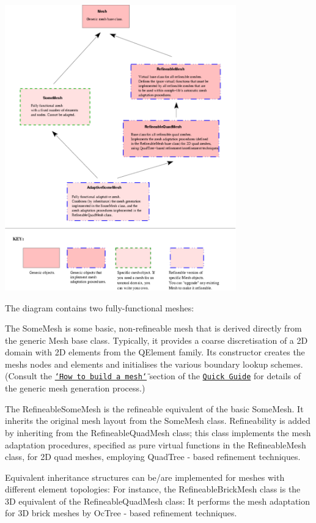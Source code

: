  
\begin{DoxyImage}
\includegraphics[width=0.75\textwidth]{refineable_mesh_inheritance}
\end{DoxyImage}


The diagram contains two fully-\/functional meshes\+:
\begin{DoxyItemize}
\item The {\ttfamily Some\+Mesh} is some basic, non-\/refineable mesh that is derived directly from the generic {\ttfamily Mesh} base class. Typically, it provides a coarse discretisation of a 2D domain with 2D elements from the {\ttfamily Q\+Element} family. Its constructor creates the mesh\textquotesingle{}s nodes and elements and initialises the various boundary lookup schemes. (Consult the \href{../../../quick_guide/html/index.html#mesh}{\tt \char`\"{}\+How to build a mesh\char`\"{}} section of the \href{../../../quick_guide/html/index.html}{\tt Quick Guide} for details of the generic mesh generation process.)
\item The {\ttfamily Refineable\+Some\+Mesh} is the refineable equivalent of the basic {\ttfamily Some\+Mesh}. It inherits the original mesh layout from the {\ttfamily Some\+Mesh} class. Refineability is added by inheriting from the {\ttfamily Refineable\+Quad\+Mesh} class; this class implements the mesh adaptation procedures, specified as pure virtual functions in the {\ttfamily Refineable\+Mesh} class, for 2D quad meshes, employing {\ttfamily Quad\+Tree} -\/ based refinement techniques.
\end{DoxyItemize}Equivalent inheritance structures can be/are implemented for meshes with different element topologies\+: For instance, the {\ttfamily Refineable\+Brick\+Mesh} class is the 3D equivalent of the {\ttfamily Refineable\+Quad\+Mesh} class\+: It performs the mesh adaptation for 3D brick meshes by {\ttfamily Oc\+Tree} -\/ based refinement techniques.

